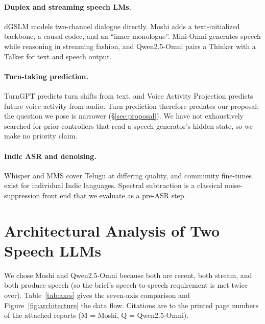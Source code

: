 \documentclass[11pt,a4paper,twocolumn]{article}
\newcommand{\M}{\textsc{M}}
\newcommand{\Q}{\textsc{Q}}
\begin{document}
\paragraph{Duplex and streaming speech LMs.} dGSLM \citep{dgslm} models two-channel dialogue directly. Moshi \citep{moshi} adds a text-initialized backbone, a causal codec, and an ``inner monologue''. Mini-Omni \citep{miniomni} generates speech while reasoning in streaming fashion, and Qwen2.5-Omni \citep{qwenomni} pairs a Thinker with a Talker for text and speech output.

\paragraph{Turn-taking prediction.} TurnGPT \citep{turngpt} predicts turn shifts from text, and Voice Activity Projection \citep{vap} predicts future voice activity from audio. Turn prediction therefore predates our proposal; the question we pose is narrower (\S\ref{sec:proposal}). We have not exhaustively searched for prior controllers that read a speech generator's hidden state, so we make no priority claim.

\paragraph{Indic ASR and denoising.} Whisper \citep{whisper} and MMS \citep{mms} cover Telugu at differing quality, and community fine-tunes exist for individual Indic languages. Spectral subtraction \citep{boll} is a classical noise-suppression front end that we evaluate as a pre-ASR step.

\section{Architectural Analysis of Two Speech LLMs}
\label{sec:analysis}

We chose Moshi and Qwen2.5-Omni because both are recent, both stream, and both produce speech (so the brief's speech-to-speech requirement is met twice over). Table~\ref{tab:axes} gives the seven-axis comparison and Figure~\ref{fig:architecture} the data flow. Citations are to the printed page numbers of the attached reports (\M{} = Moshi, \Q{} = Qwen2.5-Omni).
\end{document}
